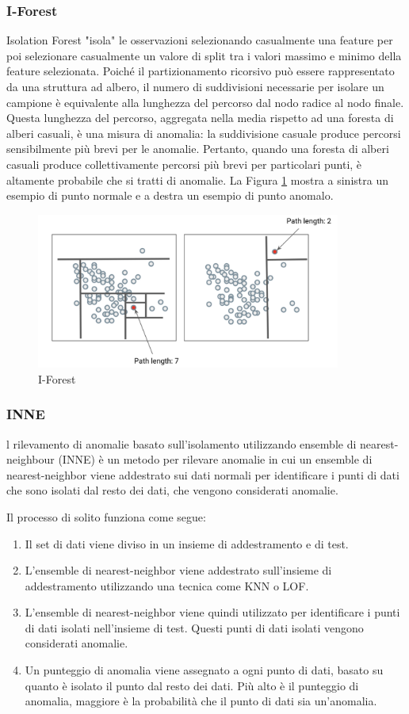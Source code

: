 \subsubsection{I-Forest}
Isolation Forest \cite{liu2008isolation, liu2012isolation} "isola" le osservazioni selezionando casualmente una feature per poi selezionare casualmente un valore di split tra i valori massimo e minimo della feature selezionata. 
Poiché il partizionamento ricorsivo può essere rappresentato da una struttura ad albero, il numero di suddivisioni necessarie per isolare un campione è equivalente alla lunghezza del percorso dal nodo radice al nodo finale.
Questa lunghezza del percorso, aggregata nella media rispetto ad una foresta di alberi casuali, è una misura di anomalia: la suddivisione casuale produce percorsi sensibilmente più brevi per le anomalie. Pertanto, quando una foresta di alberi casuali produce collettivamente percorsi più brevi per particolari punti, è altamente probabile che si tratti di anomalie.
La Figura \ref{iforest} mostra a sinistra un esempio di punto normale e a destra un esempio di punto anomalo.
\begin{figure}[t]
	\centering
	\includegraphics[width=10cm, scale=1]{images/iforest}
	\caption{I-Forest}
	\label{iforest}
\end{figure}
\subsubsection{INNE}
l rilevamento di anomalie basato sull'isolamento utilizzando ensemble di nearest-neighbour (INNE) \cite{bandaragoda2018isolation} è un metodo per rilevare anomalie in cui un ensemble di nearest-neighbor viene addestrato sui dati normali per identificare i punti di dati che sono isolati dal resto dei dati, che vengono considerati anomalie.

Il processo di solito funziona come segue:
\begin{enumerate}
\item Il set di dati viene diviso in un insieme di addestramento e di test.
\item L'ensemble di nearest-neighbor viene addestrato sull'insieme di addestramento utilizzando una tecnica come KNN o LOF.
\item L'ensemble di nearest-neighbor viene quindi utilizzato per identificare i punti di dati isolati nell'insieme di test. Questi punti di dati isolati vengono considerati anomalie.
\item Un punteggio di anomalia viene assegnato a ogni punto di dati, basato su quanto è isolato il punto dal resto dei dati. Più alto è il punteggio di anomalia, maggiore è la probabilità che il punto di dati sia un'anomalia.
\end{enumerate}

